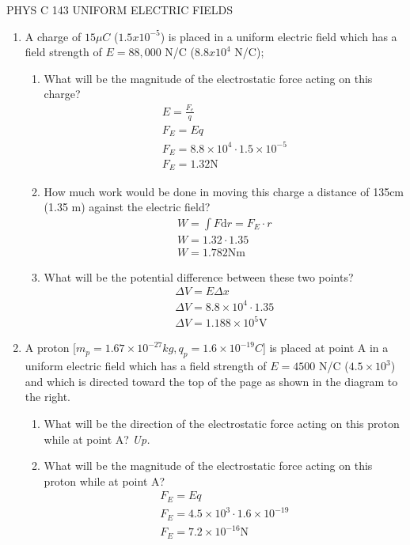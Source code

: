 \documentclass[12pt]{article}
\newcommand{\dd}[1]{\mathrm{d}#1}
\begin{document}
{\large PHYS C 143 UNIFORM ELECTRIC FIELDS}

\begin{enumerate}

  \item A charge of $15\mu C$ ($1.5x10^{-5}$) is placed in a uniform electric field which has a field strength of $E=88,000$ N/C ($8.8x10^4$ N/C);
\begin{enumerate}
  \item What will be the magnitude of the electrostatic force acting on this charge?
    \begin{align}
      E = \frac{F_{e}}{q} \\
      F_{E} = Eq \\
      F_{E} = 8.8 \times 10^{4} \cdot 1.5 \times 10^{-5} \\
      F_{E} = 1.32 \mathrm{N}
    \end{align}

  \item How much work would be done in moving this charge a distance of 135cm (1.35 m) against the electric field?
    \begin{align}
      W = \int F \dd r = F_{E} \cdot r \\
      W = 1.32 \cdot 1.35 \\
      W = 1.782 \mathrm{Nm}
    \end{align}

  \item What will be the potential difference between these two points?
    \begin{align}
      \Delta V = E\Delta x \\
      \Delta V = 8.8\times 10^4 \cdot 1.35 \\
      \Delta V = 1.188\times 10^5 \mathrm{V}
    \end{align}
\end{enumerate}

\item A proton [$m_{p} = 1.67 \times 10^{-27} kg, q_{p} = 1.6 \times 10^{-19} C$] is placed at point A in a uniform electric field which has a field strength of $E = 4500$ N/C ($4.5\times 10^{3}$) and which is directed toward the top of the page as shown in the diagram to the right.
\begin{enumerate}
  \item What will be the direction of the electrostatic force acting on this proton while at point A? \textit{Up.}

  \item What will be the magnitude of the electrostatic force acting on this proton while at point A?
    \begin{align}
      F_{E} = Eq \\
      F_{E} = 4.5 \times 10^3 \cdot 1.6 \times 10^{-19} \\
      F_{E} = 7.2 \times 10^{-16} \mathrm{N}
    \end{align}


\end{enumerate}
\end{enumerate}
\end{document}
